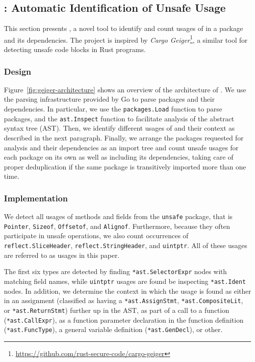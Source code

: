 \subsection{\toolUsage{}: Automatic Identification of Unsafe Usage}

This section presents \toolUsage{}, a novel tool to identify and count usages of \unsafe{} in a package and its dependencies.
The project is inspired by \textit{Cargo Geiger}\footnote{\url{https://github.com/rust-secure-code/cargo-geiger}}, a similar tool for detecting unsafe code blocks in Rust programs.

\subsubsection*{Design}

Figure~\ref{fig:geiger-architecture} shows an overview of the architecture of \toolUsage{}.
We use the parsing infrastructure provided by Go to parse packages and their dependencies.
In particular, we use the \texttt{packages.Load} function to parse packages, and the \texttt{ast.Inspect} function to facilitate analysis of the abstract syntax tree (AST).
Then, we identify different usages of \unsafe{} and their context as described in the next paragraph.
Finally, we arrange the packages requested for analysis and their dependencies as an import tree and count unsafe usages for each package on its own as well as including its dependencies, taking care of proper deduplication if the same package is transitively imported more than one time.

\subsubsection*{Implementation}

We detect all usages of methods and fields from the \texttt{unsafe} package, that is \texttt{Pointer}, \texttt{Sizeof}, \texttt{Offsetof}, and \texttt{Alignof}.
Furthermore, because they often participate in unsafe operations, we also count occurrences of \texttt{reflect.SliceHeader}, \texttt{reflect.StringHeader}, and \texttt{uintptr}.
All of these usages are referred to as \unsafe{} usages in this paper.

The first six \unsafe{} types are detected by finding \texttt{*ast.SelectorExpr} nodes with matching field names, while \texttt{uintptr} usages are found be inspecting \texttt{*ast.Ident} nodes.
In addition, we determine the context in which the \unsafe{} usage is found as either in an assignment (classified as having a \texttt{*ast.AssignStmt}, \texttt{*ast.CompositeLit}, or \texttt{*ast.ReturnStmt}) further up in the AST, as part of a call to a function (\texttt{*ast.CallExpr}), as a function parameter declaration in the function definition (\texttt{*ast.FuncType}), a general variable definition (\texttt{*ast.GenDecl}), or other.

